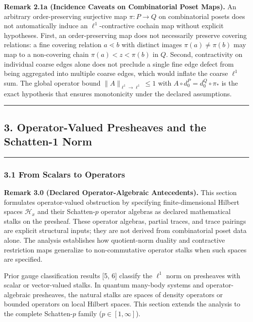 \documentclass[
]{article}
\renewenvironment{quote}
  {\begin{leftbar}\small}
  {\end{leftbar}}
\begin{document}
\textbf{Remark 2.1a (Incidence Caveats on Combinatorial Poset Maps).} An arbitrary order-preserving surjective map \(\pi: P \to Q\) on combinatorial posets does not automatically induce an \(\ell^1\)-contractive cochain map without explicit hypotheses. First, an order-preserving map does not necessarily preserve covering relations: a fine covering relation \(a \lessdot b\) with distinct images \(\pi(a) \ne \pi(b)\) may map to a non-covering chain \(\pi(a) < z < \pi(b)\) in \(Q\). Second, contractivity on individual coarse edges alone does not preclude a single fine edge defect from being aggregated into multiple coarse edges, which would inflate the coarse \(\ell^1\) sum. The global operator bound \(\|A\|_{\ell^1 \to \ell^1} \le 1\) with \(A \circ d_0^P = d_0^Q \circ \pi_*\) is the exact hypothesis that ensures monotonicity under the declared assumptions.

\begin{center}\rule{0.5\linewidth}{0.5pt}\end{center}

\subsection{3. Operator-Valued Presheaves and the Schatten-1 Norm}\label{operator-valued-presheaves-and-the-schatten-1-norm}

\begin{center}\rule{0.5\linewidth}{0.5pt}\end{center}

\subsubsection{3.1 From Scalars to Operators}\label{from-scalars-to-operators}

\begin{quote}
\textbf{Remark 3.0 (Declared Operator-Algebraic Antecedents).} This section formulates operator-valued obstruction by specifying finite-dimensional Hilbert spaces \(\mathcal{H}_x\) and their Schatten-\(p\) operator algebras as declared mathematical stalks on the presheaf. These operator algebras, partial traces, and trace pairings are explicit structural inputs; they are not derived from combinatorial poset data alone. The analysis establishes how quotient-norm duality and contractive restriction maps generalize to non-commutative operator stalks when such spaces are specified.
\end{quote}

Prior gauge classification results {[}5, 6{]} classify the \(\ell^1\) norm on presheaves with scalar or vector-valued stalks. In quantum many-body systems and operator-algebraic presheaves, the natural stalks are spaces of density operators or bounded operators on local Hilbert spaces. This section extends the analysis to the complete Schatten-\(p\) family (\(p \in [1, \infty]\)).
\end{document}
